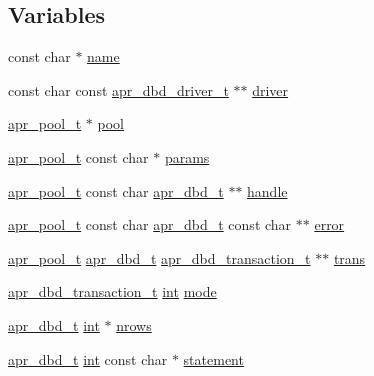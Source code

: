 \subsection*{Variables}
\begin{DoxyCompactItemize}
\item 
const char $\ast$ \hyperlink{group__APR__Util__DBD_ga775c8abc6814430216f2c583b8beaece}{name}
\item 
const char const \hyperlink{structapr__dbd__driver__t}{apr\+\_\+dbd\+\_\+driver\+\_\+t} $\ast$$\ast$ \hyperlink{group__APR__Util__DBD_ga13380de2c65258ceb1b4a477f536d0ce}{driver}
\item 
\hyperlink{structapr__pool__t}{apr\+\_\+pool\+\_\+t} $\ast$ \hyperlink{group__APR__Util__DBD_ga9069a943190f0778947265895c478883}{pool}
\item 
\hyperlink{structapr__pool__t}{apr\+\_\+pool\+\_\+t} const char $\ast$ \hyperlink{group__APR__Util__DBD_ga9a8bda9fdcb1d8f1784e4eef621a0ae2}{params}
\item 
\hyperlink{structapr__pool__t}{apr\+\_\+pool\+\_\+t} const char \hyperlink{group__APR__Util__DBD_ga4738c1f6340184987fc7806522c18ab8}{apr\+\_\+dbd\+\_\+t} $\ast$$\ast$ \hyperlink{group__APR__Util__DBD_ga3ae8808b1c40205ec08c75783ac68810}{handle}
\item 
\hyperlink{structapr__pool__t}{apr\+\_\+pool\+\_\+t} const char \hyperlink{group__APR__Util__DBD_ga4738c1f6340184987fc7806522c18ab8}{apr\+\_\+dbd\+\_\+t} const char $\ast$$\ast$ \hyperlink{group__APR__Util__DBD_ga1c7a35441d749e860588bd9c9b2092d5}{error}
\item 
\hyperlink{structapr__pool__t}{apr\+\_\+pool\+\_\+t} \hyperlink{group__APR__Util__DBD_ga4738c1f6340184987fc7806522c18ab8}{apr\+\_\+dbd\+\_\+t} \hyperlink{group__APR__Util__DBD_ga92eb10d7ec8fdb3a39a7d6fdfffdf8fb}{apr\+\_\+dbd\+\_\+transaction\+\_\+t} $\ast$$\ast$ \hyperlink{group__APR__Util__DBD_ga135dae7b88ae03090c5a7f638f980f24}{trans}
\item 
\hyperlink{group__APR__Util__DBD_ga92eb10d7ec8fdb3a39a7d6fdfffdf8fb}{apr\+\_\+dbd\+\_\+transaction\+\_\+t} \hyperlink{pcre_8txt_a42dfa4ff673c82d8efe7144098fbc198}{int} \hyperlink{group__APR__Util__DBD_ga609c0b243f5f71fe3f8c89844f390461}{mode}
\item 
\hyperlink{group__APR__Util__DBD_ga4738c1f6340184987fc7806522c18ab8}{apr\+\_\+dbd\+\_\+t} \hyperlink{pcre_8txt_a42dfa4ff673c82d8efe7144098fbc198}{int} $\ast$ \hyperlink{group__APR__Util__DBD_gab2b92eb3b022a090ef84c159253fb635}{nrows}
\item 
\hyperlink{group__APR__Util__DBD_ga4738c1f6340184987fc7806522c18ab8}{apr\+\_\+dbd\+\_\+t} \hyperlink{pcre_8txt_a42dfa4ff673c82d8efe7144098fbc198}{int} const char $\ast$ \hyperlink{group__APR__Util__DBD_ga4e2545dd013163aa26d4aa994db42fb6}{statement}

\end{DoxyCompactItemize}
